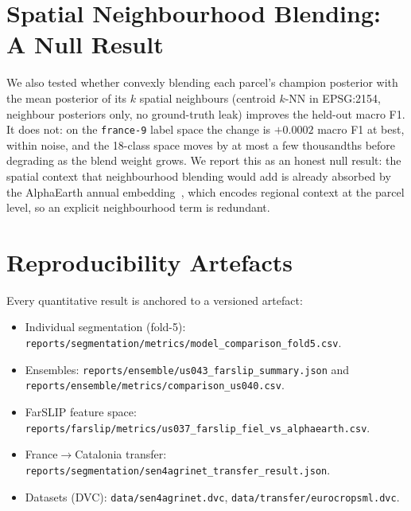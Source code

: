 \section{Spatial Neighbourhood Blending: A Null Result}
\label{app:neighbourhood}
We also tested whether convexly blending each parcel's champion
posterior with the mean posterior of its $k$ spatial neighbours
(centroid $k$-NN in EPSG:2154, neighbour posteriors only, no
ground-truth leak) improves the held-out macro F1. It does not: on the
\texttt{france-9} label space the change is $+0.0002$ macro F1 at best,
within noise, and the 18-class space moves by at most a few thousandths
before degrading as the blend weight grows. We report this as an
honest null result: the spatial context that neighbourhood blending
would add is already absorbed by the AlphaEarth annual
embedding~\cite{brown2025alphaearth}, which encodes regional context at
the parcel level, so an explicit neighbourhood term is redundant.

\section{Reproducibility Artefacts}
\label{app:repro}

Every quantitative result is anchored to a versioned artefact:

\begin{itemize}[leftmargin=*]
    \item Individual segmentation (fold-5):
    \texttt{reports/segmentation/metrics/model\_comparison\_fold5.csv}.
    \item Ensembles:
    \texttt{reports/ensemble/us043\_farslip\_summary.json} and
    \texttt{reports/ensemble/metrics/comparison\_us040.csv}.
    \item FarSLIP feature space:
    \texttt{reports/farslip/metrics/us037\_farslip\_fiel\_vs\_alphaearth.csv}.
    \item France$\rightarrow$Catalonia transfer:
    \texttt{reports/segmentation/sen4agrinet\_transfer\_result.json}.
    \item Datasets (DVC): \texttt{data/sen4agrinet.dvc},
    \texttt{data/transfer/eurocropsml.dvc}.
\end{itemize}
